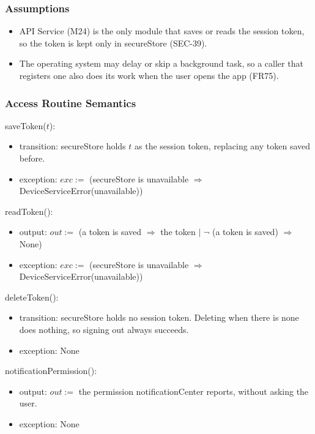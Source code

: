 \documentclass[12pt, titlepage]{article}
\begin{document}
\subsubsection{Assumptions}

\begin{itemize}
\item API Service (M24) is the only module that saves or reads the session
  token, so the token is kept only in secureStore (SEC-39).
\item The operating system may delay or skip a background task, so a caller
  that registers one also does its work when the user opens the app (FR75).
\end{itemize}

\subsubsection{Access Routine Semantics}

\noindent saveToken($t$):
\begin{itemize}
\item transition: secureStore holds $t$ as the session token, replacing any
  token saved before.
\item exception: $exc :=$ (secureStore is unavailable $\Rightarrow$
  DeviceServiceError(unavailable))
\end{itemize}

\noindent readToken():
\begin{itemize}
\item output: $out :=$ (a token is saved $\Rightarrow$ the token $|$
  $\neg$ (a token is saved) $\Rightarrow$ None)
\item exception: $exc :=$ (secureStore is unavailable $\Rightarrow$
  DeviceServiceError(unavailable))
\end{itemize}

\noindent deleteToken():
\begin{itemize}
\item transition: secureStore holds no session token. Deleting when there is
  none does nothing, so signing out always succeeds.
\item exception: None
\end{itemize}

\noindent notificationPermission():
\begin{itemize}
\item output: $out :=$ the permission notificationCenter reports, without
  asking the user.
\item exception: None
\end{itemize}
\end{document}
